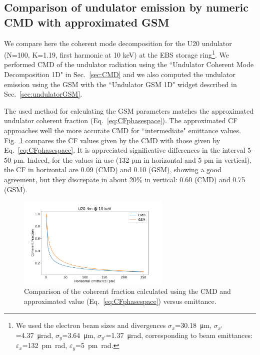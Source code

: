 \documentclass{iopconfser}
\begin{document}
\subsection{Comparison of undulator emission by numeric CMD with approximated GSM}\label{sec:CMDvsGSM}
We compare here the coherent mode decomposition for the U20 undulator (N=100, K=1.19, first harmonic at 10 keV) at the EBS storage ring\footnote{We used the electron beam sizes and divergences 
$\sigma_x$=\SI{30.18}{\micro\meter},
$\sigma_{x'}$=\SI{4.37}{\micro\radian},
$\sigma_y$=\SI{3.64}{\micro\meter},
$\sigma_{y'}$=\SI{1.37}{\micro\radian},
corresponding to beam emittances:  $\varepsilon_x$=\SI{132}{\pico\meter \radian},
$\varepsilon_y$=\SI{5}{\pico\meter \radian}.
}.
We performed CMD of the undulator radiation using the ``Undulator Coherent Mode Decomposition 1D" in Sec.~\ref{sec:CMD} and we also computed the undulator emission using the GSM with the ``Undulator GSM 1D" widget described in Sec.~\ref{sec:undulatorGSM}. 

The used method for calculating the GSM parameters matches the approximated undulator coherent fraction (Eq.~\ref{eq:CFphasespace}). The approximated CF approaches well the more accurate CMD for ``intermediate" emittance values. Fig.~\ref{fig:CFvsEmittance} compares the CF values given by the CMD with those given by Eq.~\ref{eq:CFphasespace}. It  is appreciated significative differences in the interval 5-50 pm. Indeed, for the values in use (132 pm in horizontal and 5 pm in vertical), the CF in horizontal are 0.09 (CMD) and 0.10 (GSM), showing a good agreement, but they discrepate in about 20\% in vertical: 0.60 (CMD) and 0.75 (GSM). 

\begin{figure}
    \centering
    \includegraphics[width=0.65\textwidth]{figures/CFvsEmittance.pdf}
        
    \caption{Comparison of the coherent fraction calculated using the CMD and approximated value (Eq.~\ref{eq:CFphasespace}) versus emittance.}
    \label{fig:CFvsEmittance}
\end{figure}
\end{document}
